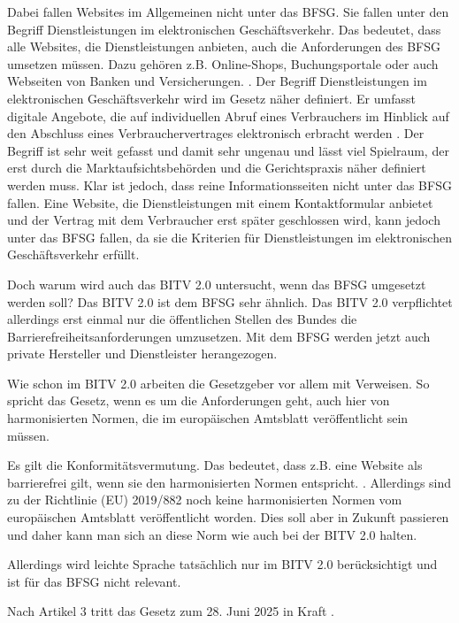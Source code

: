 Dabei fallen Websites im Allgemeinen nicht unter das BFSG. Sie fallen unter den Begriff Dienstleistungen im elektronischen Geschäftsverkehr. Das bedeutet, dass alle Websites, die Dienstleistungen anbieten, auch die Anforderungen des BFSG umsetzen müssen. Dazu gehören z.B. Online-Shops, Buchungsportale oder auch Webseiten von Banken und Versicherungen. \parencite[vgl.][]{bmas_bfsg1_2021}. Der Begriff Dienstleistungen im elektronischen Geschäftsverkehr wird im Gesetz näher definiert. Er umfasst digitale Angebote, die auf individuellen Abruf eines Verbrauchers im Hinblick auf den Abschluss eines Verbrauchervertrages elektronisch erbracht werden \parencite[vgl.][]{bmas_bfsg2_2021}. Der Begriff ist sehr weit gefasst und damit sehr ungenau und lässt viel Spielraum, der erst durch die Marktaufsichtsbehörden und die Gerichtspraxis näher definiert werden muss. Klar ist jedoch, dass reine Informationsseiten nicht unter das BFSG fallen. Eine Website, die Dienstleistungen mit einem Kontaktformular anbietet und der Vertrag mit dem Verbraucher erst später geschlossen wird, kann jedoch unter das BFSG fallen, da sie die Kriterien für Dienstleistungen im elektronischen Geschäftsverkehr erfüllt.

Doch warum wird auch das BITV 2.0 untersucht, wenn das BFSG umgesetzt werden soll? Das BITV 2.0 ist dem BFSG sehr ähnlich. Das BITV 2.0 verpflichtet allerdings erst einmal nur die öffentlichen Stellen des Bundes die Barrierefreiheitsanforderungen umzusetzen. Mit dem BFSG werden jetzt auch private Hersteller und Dienstleister herangezogen. 

Wie schon im BITV 2.0 arbeiten die Gesetzgeber vor allem mit Verweisen. So spricht das Gesetz, wenn es um die Anforderungen geht, auch hier von harmonisierten Normen, die im europäischen Amtsblatt veröffentlicht sein müssen. 

Es gilt die Konformitätsvermutung. Das bedeutet, dass z.B. eine Website als barrierefrei gilt, wenn sie den harmonisierten Normen entspricht. \parencite[vgl.][]{bmas_bfsg4_2021}. Allerdings sind zu der Richtlinie (EU) 2019/882 noch keine harmonisierten Normen vom europäischen Amtsblatt veröffentlicht worden. Dies soll aber in Zukunft passieren \parencite[vgl.][]{etsi_historyen301549_2025} und daher kann man sich an diese Norm wie auch bei der BITV 2.0 halten.

Allerdings wird leichte Sprache tatsächlich nur im BITV 2.0 berücksichtigt und ist für das BFSG nicht relevant.

Nach Artikel 3 tritt das Gesetz zum 28. Juni 2025 in Kraft \parencite[vgl.][]{bmas_bfsgA3_2021}.


